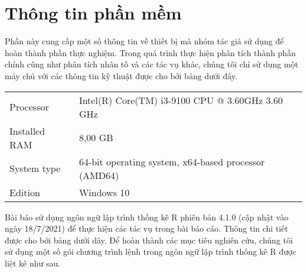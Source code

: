 \documentclass[../thesis.tex]{subfiles}
\begin{document}
\section{Thông tin phần mềm}
Phần này cung cấp một số thông tin về thiết bị mà nhóm tác giả sử dụng để hoàn thành phần thực nghiệm. Trong quá trình thực hiện phân tích thành phần chính cũng như phân tích nhân tố và các tác vụ khác, chúng tôi chỉ sử dụng một máy chủ với các thông tin kỹ thuật được cho bởi bảng dưới đây.
	
\begin{table}[H]
	\centering
	\begin{tabular}{ll}
		\toprule[1.5pt]
		
		Processor			&  Intel(R) Core(TM) i3-9100 CPU @ 3.60GHz   3.60 GHz\\
		Installed RAM		&  8,00 GB \\
		System type 		&  64-bit operating system, x64-based processor (AMD64)\\
		Edition				& Windows 10\\
		\bottomrule[1.5pt]
	\end{tabular}
\end{table}

Bài báo sử dụng ngôn ngữ lập trình thống kê R phiên bản 4.1.0 (cập nhật vào ngày 18/7/2021) để thực hiện các tác vụ trong bài báo cáo. Thông tin chi tiết được cho bởi bảng dưới dây. Để hoàn thành các mục tiêu nghiên cứu, chúng tôi sử dụng một số gói chương trình lệnh trong ngôn ngữ lập trình thống kê R được liệt kê như sau.

\begin{Shaded}
	\begin{Highlighting}[]
\OtherTok{\textless{}{-}} \NormalTok{(}\NormalTok{, }\NormalTok{, }\NormalTok{, }\NormalTok{,}
	\NormalTok{, }\NormalTok{, }\NormalTok{, }\NormalTok{)}
 \NormalTok{)}
	\end{Highlighting}
\end{Shaded}
\end{document}
